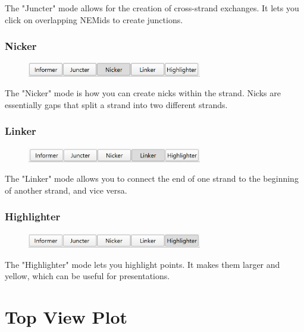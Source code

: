 \documentclass[titlepage]{article}
\begin{document}
	The "Juncter" mode allows for the creation of cross-strand exchanges. It lets you click on overlapping NEMids to create junctions.

	\subsubsection{Nicker}

	\begin{figure}[h]
		\centering
		\includegraphics[width=3in]{"nicker-activated.png"}
		\label{fig:nicker-activated}
	\end{figure}

	The "Nicker" mode is how you can create nicks within the strand. Nicks are essentially gaps that split a strand into two different strands.

	\subsubsection{Linker}

	\begin{figure}[h]
		\centering
		\includegraphics[width=3in]{"linker-activated.png"}
		\label{fig:linker-activated}
	\end{figure}

	The "Linker" mode allows you to connect the end of one strand to the beginning of another strand, and vice versa.

	\subsubsection{Highlighter}

	\begin{figure}[h]
		\centering
		\includegraphics[width=3in]{"highlighter-activated.png"}
		\label{fig:highlighter-activated}
	\end{figure}

	The "Highlighter" mode lets you highlight points. It makes them larger and yellow, which can be useful for presentations.
	
	\section{Top View Plot}
	
\end{document}
